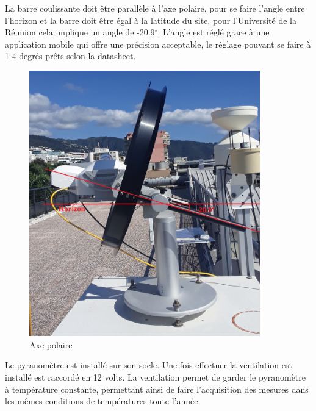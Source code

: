 \documentclass[12pt,a4paper]{article}
\begin{document}
\begin{flushleft}
La barre coulissante doit être parallèle à l'axe polaire, pour se faire l'angle entre l'horizon et la barre doit être égal à la latitude du site, pour l'Université de la Réunion cela implique un angle de -20.9$^\circ$. L'angle est réglé grace à une application mobile qui offre une précision acceptable, le réglage pouvant se faire à 1-4 degrés prêts selon la datasheet.

\begin{figure}[H]
\centering
\includegraphics[width=10cm]{image/montage/3.jpg} 
\caption{Axe polaire}
\end{figure}


Le pyranomètre est installé sur son socle. Une fois effectuer la ventilation est installé est raccordé en 12 volts. La ventilation permet de garder le pyranomètre à température constante, permettant ainsi de faire l'acquisition des mesures dans les mêmes conditions de températures toute l'année.


\end{flushleft}
\end{document}
